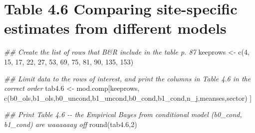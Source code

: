 \documentclass[
  letterpaper,
  DIV=11,
  numbers=noendperiod]{scrreprt}
\newenvironment{Shaded}{\begin{snugshade}}{\end{snugshade}}
\newcommand{\DecValTok}[1]{\textcolor[rgb]{0.25,0.63,0.44}{#1}}
\newcommand{\DocumentationTok}[1]{\textcolor[rgb]{0.73,0.13,0.13}{\textit{#1}}}
\newcommand{\FloatTok}[1]{\textcolor[rgb]{0.25,0.63,0.44}{#1}}
\newcommand{\FunctionTok}[1]{\textcolor[rgb]{0.02,0.16,0.49}{#1}}
\newcommand{\NormalTok}[1]{\textcolor[rgb]{0.00,0.44,0.13}{#1}}
\newcommand{\OtherTok}[1]{\textcolor[rgb]{0.00,0.44,0.13}{#1}}
\newcommand{\StringTok}[1]{\textcolor[rgb]{0.25,0.44,0.63}{#1}}
\begin{document}
\hypertarget{table-4.6-comparing-site-specific-estimates-from-different-models}{%
\section{Table 4.6 Comparing site-specific estimates from different
models}\label{table-4.6-comparing-site-specific-estimates-from-different-models}}

\begin{Shaded}
\begin{Highlighting}[]
\DocumentationTok{\#\# Create the list of rows that B\&R include in the table p. 87}
\NormalTok{keeprows }\OtherTok{\textless{}{-}} \FunctionTok{c}\NormalTok{(}\DecValTok{4}\NormalTok{, }\DecValTok{15}\NormalTok{, }\DecValTok{17}\NormalTok{, }\DecValTok{22}\NormalTok{, }\DecValTok{27}\NormalTok{, }\DecValTok{53}\NormalTok{, }\DecValTok{69}\NormalTok{, }\DecValTok{75}\NormalTok{, }\DecValTok{81}\NormalTok{, }\DecValTok{90}\NormalTok{, }\DecValTok{135}\NormalTok{, }\DecValTok{153}\NormalTok{)}

\DocumentationTok{\#\# Limit data to the rows of interest, and print the columns in Table 4.6 in the correct order}
\NormalTok{tab4}\FloatTok{.6} \OtherTok{\textless{}{-}}\NormalTok{ mod.comp[keeprows, }\FunctionTok{c}\NormalTok{(}\StringTok{\textquotesingle{}b0\_ols\textquotesingle{}}\NormalTok{,}\StringTok{\textquotesingle{}b1\_ols\textquotesingle{}}\NormalTok{,}\StringTok{\textquotesingle{}b0\_uncond\textquotesingle{}}\NormalTok{,}\StringTok{\textquotesingle{}b1\_uncond\textquotesingle{}}\NormalTok{,}\StringTok{\textquotesingle{}b0\_cond\textquotesingle{}}\NormalTok{,}\StringTok{\textquotesingle{}b1\_cond\textquotesingle{}}\NormalTok{,}\StringTok{\textquotesingle{}n\_j\textquotesingle{}}\NormalTok{,}\StringTok{\textquotesingle{}meanses\textquotesingle{}}\NormalTok{,}\StringTok{\textquotesingle{}sector\textquotesingle{}}\NormalTok{) ]}


\DocumentationTok{\#\# Print Table 4.6 {-}{-} the Empirical Bayes from conditional model (b0\_cond, b1\_cond) are waaaaaay off}
\FunctionTok{round}\NormalTok{(tab4}\FloatTok{.6}\NormalTok{,}\DecValTok{2}\NormalTok{)}
\end{Highlighting}
\end{Shaded}
\end{document}
